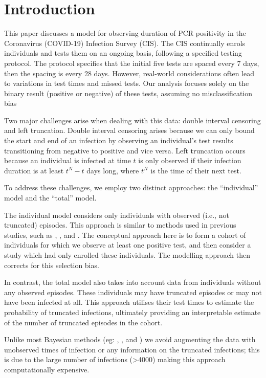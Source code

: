 \documentclass[main.tex]{subfiles}
\begin{document}
\section{Introduction}\label{introduction}

This paper discusses a model for observing duration of PCR positivity in
the Coronavirus (COVID-19) Infection Survey (CIS). The CIS continually
enrols individuals and tests them on an ongoing basis, following a
specified testing protocol. The protocol specifies that the initial five
tests are spaced every 7 days, then the spacing is every 28 days.
However, real-world considerations often lead to variations in test
times and missed tests. Our analysis focuses solely on the binary result
(positive or negative) of these tests, assuming no misclassification
bias

Two major challenges arise when dealing with this data: double interval
censoring and left truncation. Double interval censoring arises because
we can only bound the start and end of an infection by observing an
individual's test results transitioning from negative to positive and
vice versa. Left truncation occurs because an individual is infected at
time $t$ is only observed if their infection duration is at least
$t^N - t$ days long, where $t^N$ is the time of their next test.

To address these challenges, we employ two distinct approaches: the
``individual'' model and the ``total'' model.

The individual model considers only individuals with observed (i.e., not
truncated) episodes. This approach is similar to methods used in
previous studies, such as \textcite{heiseyModelling},
\textcite{dempsterMaximum}, and
\textcite{turnbullEmpirical}. The conceptual
approach here is to form a cohort of individuals for which we observe at
least one positive test, and then consider a study which had only
enrolled these individuals. The modelling approach then corrects for
this selection bias.

In contrast, the total model also takes into account data from
individuals without any observed episodes. These individuals may have
truncated episodes or may not have been infected at all. This approach
utilises their test times to estimate the probability of truncated
infections, ultimately providing an interpretable estimate of the number
of truncated episodes in the cohort.

Unlike most Bayesian methods (eg: \textcite{heBayesiana}, \textcite{heBayesian}, and \textcite{caoModeling}) we avoid augmenting the
data with unobserved times of infection or any information on the
truncated infections; this is due to the large number of infections
(>4000) making this approach computationally expensive.
\end{document}
